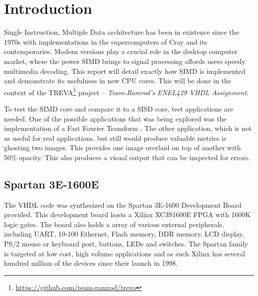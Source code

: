 \section{Introduction}

 Single Instruction, Multiple Data architecture has been in 
existence since the 1970s with implementations in the supercomputers of Cray 
and its contemporaries. Modern versions play a crucial role in the 
desktop computer market, where the power SIMD brings to signal
processing affords users speedy multimedia decoding\cite{bonnot2008definition}. This
report will detail exactly how SIMD is implemented and demonstrate its usefulness
in new CPU cores.  This will be done in the context of the
TREVA\footnote{\url{https://github.com/team-ramrod/treva}} project --
\emph{Team-Ramrod's ENEL429 VHDL Assignment}.




To test the SIMD core  and compare it to a SISD core, test applications are
needed. One of the possible applications that was being explored was the
implementation of a Fast Fourier Transform \cite{Jamieson198648}. The other
application, which is not as useful for real applications, but still would
produce valuable metrics is ghosting two images. This provides one image
overlaid on top of another with 50\% opacity. This also produces a visual output
that can be inspected for errors.


\subsection{Spartan 3E-1600E}
The VHDL code was synthesized on the Spartan 3E-1600 Development Board
provided. This development board hosts a Xilinx XC3S1600E FPGA with 1600K
logic gates. The board also holds a array of various external peripherals,
including UART, 10-100 Ethernet, Flash memory, DDR memory, LCD display, PS/2
mouse or keyboard port, buttons, LEDs and switches. The Spartan family is targeted
at low cost, high volume applications and as such Xilinx has several hundred million
of the devices\cite{xilinxpress} since their launch in 1998.



